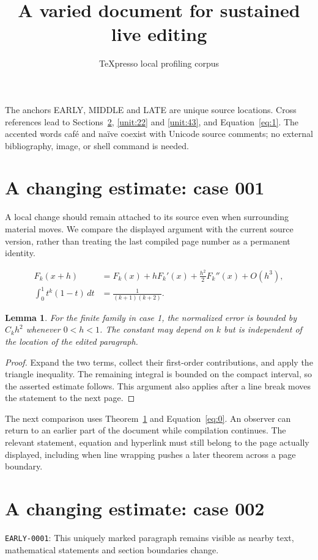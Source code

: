 \documentclass[a4paper,10pt]{article}
\title{A varied document for sustained live editing}
\author{TeXpresso local profiling corpus}
\date{}
\newtheorem{lemma}[theorem]{Lemma}
\begin{document}
\maketitle
The anchors EARLY, MIDDLE and LATE are unique source locations. Cross references
lead to Sections~\ref{unit:1}, \ref{unit:22} and \ref{unit:43},
and Equation~\ref{eq:1}. The accented words caf\'{e} and na\"ive coexist with
Unicode source comments; no external bibliography, image, or shell command is needed.

\section{A changing estimate: case 001}\label{unit:0}
A local change should remain attached to its source even when surrounding material moves. We compare the displayed argument with the current source version, rather than treating the last compiled page number as a permanent identity.

\lipsum[1-2]
\begin{align}\label{eq:0}
 F_k(x+h)&=F_k(x)+hF_k'(x)+\frac{h^2}{2}F_k''(x)+O(h^3),\\
 \int_0^1 t^k(1-t)\,dt&=\frac{1}{(k+1)(k+2)}.
\end{align}
\begin{lemma}\label{thm:0}
For the finite family in case 1, the normalized error is bounded by $C_k h^2$ whenever $0<h<1$. The constant may depend on $k$ but is independent of the location of the edited paragraph.
\end{lemma}
\begin{proof}
Expand the two terms, collect their first-order contributions, and apply the
triangle inequality. The remaining integral is bounded on the compact interval,
so the asserted estimate follows. This argument also applies after a line break
moves the statement to the next page.
\end{proof}
The next comparison uses Theorem~\ref{thm:0} and Equation~\ref{eq:0}. An observer can return to an earlier part of the document while compilation continues. The relevant statement, equation and hyperlink must still belong to the page actually displayed, including when line wrapping pushes a later theorem across a page boundary.

\lipsum[3]

\section{A changing estimate: case 002}\label{unit:1}
\hypertarget{varied:early}{}\label{anchor:early}
\noindent \texttt{EARLY-0001}: This uniquely marked paragraph remains visible as nearby text, mathematical statements and section boundaries change.
\end{document}

